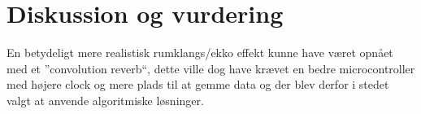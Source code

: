 \chapter{Diskussion og vurdering}\label{kap:diskussion}
\vspace*{.5cm}




En betydeligt mere realistisk rumklangs/ekko effekt kunne have været opnået med et ''convolution reverb``, dette ville dog have krævet en bedre microcontroller med højere clock og mere plads til at gemme data og der blev derfor i stedet valgt at anvende algoritmiske løsninger.



